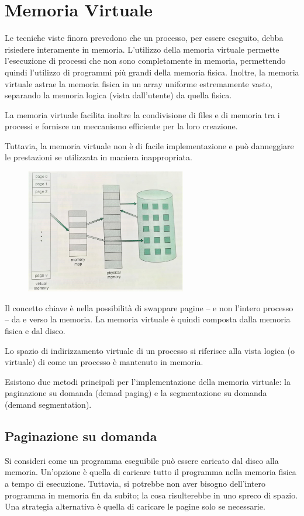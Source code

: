 \documentclass[a4paper]{article}
\begin{document}
\newpage
\section{Memoria Virtuale}
Le tecniche viste finora prevedono che un processo, per essere eseguito, debba risiedere interamente in memoria. L'utilizzo della memoria virtuale permette l'esecuzione di processi che non sono completamente in memoria, permettendo quindi l'utilizzo di programmi più grandi della memoria fisica. Inoltre, la memoria virtuale astrae la memoria fisica in un array uniforme estremamente vasto, separando la memoria logica (vista dall'utente) da quella fisica.

La memoria virtuale facilita inoltre la condivisione di files e di memoria tra i processi e fornisce un meccanismo efficiente per la loro creazione.

Tuttavia, la memoria virtuale non è di facile implementazione e può danneggiare le prestazioni se utilizzata in maniera inappropriata.

\begin{figure}
   \includegraphics[width=7cm]{img/virtmem.jpeg}
\end{figure}
Il concetto chiave è nella possibilità di swappare pagine -- e non l'intero processo -- da e verso la memoria. La memoria virtuale è quindi composta dalla memoria fisica e dal disco.

Lo spazio di indirizzamento virtuale di un processo si riferisce alla vista logica (o virtuale) di come un processo è mantenuto in memoria.

Esistono due metodi principali per l'implementazione della memoria virtuale: la paginazione su domanda (demad paging) e la segmentazione su domanda (demand segmentation).

\subsection{Paginazione su domanda}
Si consideri come un programma eseguibile può essere caricato dal disco alla memoria. Un'opzione è quella di caricare tutto il programma nella memoria fisica a tempo di esecuzione. Tuttavia, si potrebbe non aver bisogno dell'intero programma in memoria fin da subito; la cosa risulterebbe in uno spreco di spazio. Una strategia alternativa è quella di caricare le pagine solo se necessarie.
\end{document}
